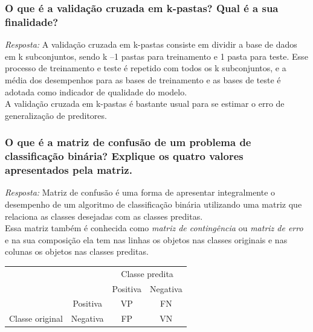 \documentclass{article}
\begin{document}
\subsubsection{O que é a validação cruzada em k-pastas? Qual é a sua finalidade?}
\textit{Resposta:} A validação cruzada em k-pastas consiste em dividir a base de dados em k subconjuntos, sendo k –1 pastas para treinamento e 1 pasta para teste. Esse processo de treinamento e teste é repetido com todos os k subconjuntos, e a média dos desempenhos para as bases de treinamento e as bases de teste é adotada como indicador de qualidade do modelo. \\
A validação cruzada em k-pastas é bastante usual para se estimar o erro de generalização de preditores.


\subsubsection{O que é a matriz de confusão de um problema de classificação binária? Explique os quatro valores apresentados pela matriz.}
\textit{Resposta:} Matriz de confusão é uma forma de apresentar integralmente o desempenho de um algoritmo de classificação binária utilizando uma matriz que relaciona as classes desejadas com as classes preditas. \\
Essa matriz também é conhecida como \textit{matriz de contingência} ou \textit{matriz de erro} e na sua composição ela tem nas linhas os objetos nas classes originais e nas colunas os objetos nas classes preditas.

\begin{center}
  \begin{table}[H]
    \centering
      \begin{tabular}{ll|c|c|}
      \cline{3-4}
                                                                                      &                                                       & \multicolumn{2}{c|}{\cellcolor[HTML]{C0C0C0}Classe predita}         \\ \cline{3-4} 
                                                                                      &                                                       & \cellcolor[HTML]{C0C0C0}Positiva & \cellcolor[HTML]{C0C0C0}Negativa \\ \hline
      \multicolumn{1}{|c|}{\cellcolor[HTML]{C0C0C0}}                                  & \multicolumn{1}{c|}{\cellcolor[HTML]{C0C0C0}Positiva} & VP                               & FN                               \\ \cline{2-4} 
      \multicolumn{1}{|c|}{\multirow{-2}{*}{\cellcolor[HTML]{C0C0C0}Classe original}} & \multicolumn{1}{c|}{\cellcolor[HTML]{C0C0C0}Negativa} & FP                               & VN                               \\ \hline
    \end{tabular}
  \end{table}
\end{center}
\end{document}
